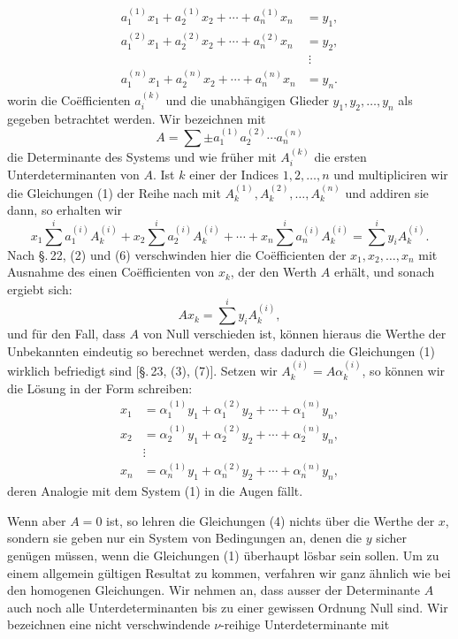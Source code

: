 
\begin{equation}
\begin{aligned}
 a_1^{(1)}x_1+a_2^{(1)}x_2+\cdots+a_n^{(1)}x_n&=y_1,\\
 a_1^{(2)}x_1+a_2^{(2)}x_2+\cdots+a_n^{(2)}x_n&=y_2,\\
 &\ \vdots\\
 a_1^{(n)}x_1+a_2^{(n)}x_2+\cdots+a_n^{(n)}x_n&=y_n.
\end{aligned}
\tag{1}
\end{equation}
worin die Coëfficienten $a_i^{(k)}$ und die unabhängigen Glieder $y_1,y_2,\ldots,y_n$ als gegeben betrachtet werden. Wir bezeichnen mit
\begin{equation}
 A=\sum\pm a_1^{(1)}a_2^{(2)}\cdots a_n^{(n)}
\tag{2}
\end{equation}
die Determinante des Systems und wie früher mit $A_i^{(k)}$ die ersten Unterdeterminanten von $A$. Ist $k$ einer der Indices $1,2,\ldots,n$ und multipliciren wir die Gleichungen (1) der Reihe nach mit $A_k^{(1)},A_k^{(2)},\ldots,A_k^{(n)}$ und addiren sie dann, so erhalten wir
\begin{equation}
 x_1\sum^{i}a_1^{(i)}A_k^{(i)}+
 x_2\sum^{i}a_2^{(i)}A_k^{(i)}+
 \cdots+
 x_n\sum^{i}a_n^{(i)}A_k^{(i)}
 =\sum^{i}y_iA_k^{(i)}.
\tag{3}
\end{equation}
Nach \S.\,22, (2) und (6) verschwinden hier die Coëfficienten der $x_1,x_2,\ldots,x_n$ mit Ausnahme des einen Coëfficienten von $x_k$, der den Werth $A$ erhält, und sonach ergiebt sich:
\begin{equation}
 A x_k=\sum^{i}y_iA_k^{(i)},
\tag{4}
\end{equation}
und für den Fall, dass $A$ von Null verschieden ist, können hieraus die Werthe der Unbekannten eindeutig so berechnet werden, dass dadurch die Gleichungen (1) wirklich befriedigt sind [\S.\,23, (3), (7)]. Setzen wir $A_k^{(i)}=A\alpha_k^{(i)}$, so können wir die Lösung in der Form schreiben:
\begin{equation}
\begin{aligned}
 x_1&=\alpha_1^{(1)}y_1+\alpha_1^{(2)}y_2+\cdots+\alpha_1^{(n)}y_n,\\
 x_2&=\alpha_2^{(1)}y_1+\alpha_2^{(2)}y_2+\cdots+\alpha_2^{(n)}y_n,\\
 &\vdots\\
 x_n&=\alpha_n^{(1)}y_1+\alpha_n^{(2)}y_2+\cdots+\alpha_n^{(n)}y_n,
\end{aligned}
\tag{5}
\end{equation}
deren Analogie mit dem System (1) in die Augen fällt.

Wenn aber $A=0$ ist, so lehren die Gleichungen (4) nichts über die Werthe der $x$, sondern sie geben nur ein System von Bedingungen an, denen die $y$ sicher genügen müssen, wenn die Gleichungen (1) überhaupt lösbar sein sollen. Um zu einem allgemein gültigen Resultat zu kommen, verfahren wir ganz ähnlich wie bei den homogenen Gleichungen. Wir nehmen an, dass ausser der Determinante $A$ auch noch alle Unterdeterminanten bis zu einer gewissen Ordnung Null sind. Wir bezeichnen eine nicht verschwindende $\nu$-reihige Unterdeterminante mit
